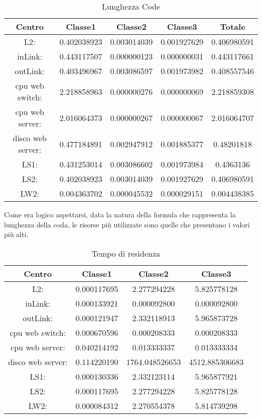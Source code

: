 \begin{table}[htbp]
\begin{center}
\begin{tabular}{|c|c|c|c|c|}
\hline
Centro &Classe1 &Classe2 &Classe3 &Totale\\
\hline
\hline
L2: &0.402038923 &0.003014039 &0.001927629 &0.406980591\\
\hline
inLink: &0.443117507 &0.000000123 &0.000000031 &0.443117661\\
\hline
outLink: &0.403496967 &0.003086597 &0.001973982 &0.408557546\\
\hline
cpu web switch: &2.218858963 &0.000000276 &0.000000069 &2.218859308\\
\hline
cpu web server: &2.016064373  &0.000000267 &0.000000067 &2.016064707\\
\hline
disco web server: &0.477184891 &0.002947912 &0.001885377 &0.48201818\\
\hline
LS1: &0.431253014 &0.003086602 &0.001973984 &0.4363136\\
\hline
LS2: &0.402038923 &0.003014039 &0.001927629 &0.406980591\\
\hline
LW2: &0.004363702 &0.000045532 &0.000029151 &0.004438385\\
\hline
\end{tabular}
\end{center}
\caption{Lunghezza Code}
\label{lunghezzacode}
\end{table}
Come era logico aspettarsi, data la natura della formula che rappresenta la lunghezza della coda, le risorse più utilizzate sono quelle che presentano i valori più alti.
\begin{table}[htbp]
\begin{center}
\begin{tabular}{|c|c|c|c|}
\hline
Centro &Classe1 &Classe2 &Classe3\\
\hline
\hline
L2: &0.000117695 &2.277294228 &5.825778128\\
\hline
inLink: &0.000133921 &0.000092800 &0.000092800\\
\hline
outLink: &0.000121947 &2.332118913 &5.965873728\\
\hline
cpu web switch: &0.000670596 &0.000208333 &0.000208333\\
\hline
cpu web server: &0.040214192 &0.013333337 &0.013333334\\
\hline
disco web server: &0.114220190 &1764.048526653 &4512.885306683\\
\hline
LS1: &0.000130336 &2.332123114 &5.965877921\\
\hline
LS2: &0.000117695 &2.277294228 &5.825778128\\
\hline
LW2: &0.000084312 &2.270554378 &5.814739298\\
\hline
\end{tabular}
\end{center}
\caption{Tempo di residenza}
\label{tempodiresidenza}
\end{table}
